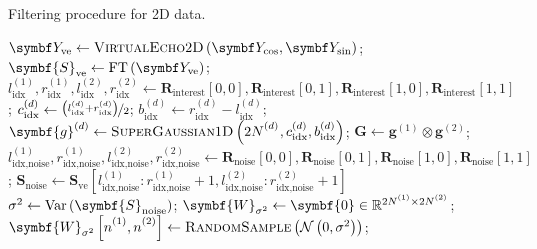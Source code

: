 \begin{algorithm}[h!]
    \begin{algorithmic}[1]
        \caption{Filtering procedure for 2D data.}
        \label{alg:filter-2d}
            \State $\bY_{\text{ve}} \gets \textsc{VirtualEcho$2$D}\left(\bY_{\cos}, \bY_{\sin}\right)$;
            \State $\symbf{S}_{\text{ve}} \gets \FT\left(\bY_{\text{ve}}\right)$;
            \State $
                l^{(1)}_{\text{idx}},
                r^{(1)}_{\text{idx}},
                l^{(2)}_{\text{idx}},
                r^{(2)}_{\text{idx}}
                \gets
                \symbf{R}_{\text{interest}}[0,0],
                \symbf{R}_{\text{interest}}[0,1],
                \symbf{R}_{\text{interest}}[1,0],
                \symbf{R}_{\text{interest}}[1,1]
                $;
                \State $c_{\text{idx}}^{(d)} \gets \nicefrac{\left(l_{\text{idx}}^{(d)} + r_{\text{idx}}^{(d)}\right)}{2}$;
                \State $b_{\text{idx}}^{(d)} \gets r_{\text{idx}}^{(d)} - l_{\text{idx}}^{(d)}$;
                \State $\symbf{g}^{(d)} \gets \textsc{SuperGaussian$1$D}\left( 2\Nd_{\vphantom{\text{idx}}}, c_{\text{idx}}^{(d)}, b_{\text{idx}}^{(d)} \right)$;
                \State $\symbf{G} \gets  \symbf{g}^{(1)} \otimes \symbf{g}^{(2)}$;
            \EndFor
            \State $
                l^{(1)}_{\text{idx,noise}},
                r^{(1)}_{\text{idx,noise}},
                l^{(2)}_{\text{idx,noise}},
                r^{(2)}_{\text{idx,noise}}
                \gets
                \symbf{R}_{\text{noise}}[0,0],
                \symbf{R}_{\text{noise}}[0,1],
                \symbf{R}_{\text{noise}}[1,0],
                \symbf{R}_{\text{noise}}[1,1]
                $;
            \State $\symbf{S}_{\text{noise}} \gets \symbf{S}_{\text{ve}} \left[
                    l^{(1)}_{\text{idx,noise}} :
                    r^{(1)}_{\text{idx,noise}} + 1,
                    l^{(2)}_{\text{idx,noise}} :
                    r^{(2)}_{\text{idx,noise}} + 1
                \right] $
            \State $\sigma^2 \gets \Var\left(\symbf{S}_{\text{noise}}\right)$;
            \State $\symbf{W}_{\sigma^2} \gets \symbf{0} \in \mathbb{R}^{2\None \times 2\Ntwo}$;
                    \State $\symbf{W}_{\sigma^2}\left[ \none, \ntwo \right] \gets \textsc{RandomSample}\left(\mathcal{N}\left(0, \sigma^2\right)\right)$;

\end{algorithmic}
\end{algorithm}
